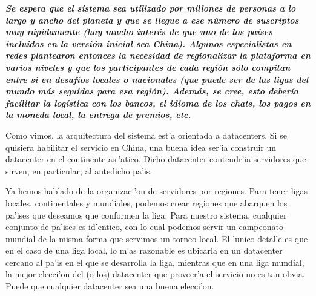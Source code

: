\textbf{\textit{Se espera que el sistema sea utilizado por millones de personas a lo largo y ancho del planeta y que se llegue a ese número de suscriptos muy rápidamente (hay mucho interés de que uno de los países incluidos en la versión inicial sea China). Algunos especialistas en redes plantearon entonces la necesidad de regionalizar la plataforma en varios niveles y que los participantes de cada región sólo compitan entre sí en desafíos locales o nacionales (que puede ser de las ligas del mundo más seguidas para esa región). Además, se cree, esto debería facilitar la logística con los bancos, el idioma de los chats, los pagos en la moneda local, la entrega de premios, etc.
}}

Como vimos, la arquitectura del sistema est'a orientada a datacenters. Si se quisiera habilitar el servicio en China, una buena idea ser'ia construir un datacenter en el continente asi'atico. Dicho datacenter contendr'ia servidores que sirven, en particular, al antedicho pa'is.

Ya hemos hablado de la organizaci'on de servidores por regiones. Para tener ligas locales, continentales y mundiales, podemos crear regiones que abarquen los pa'ises que deseamos que conformen la liga. Para nuestro sistema, cualquier conjunto de pa'ises es id'entico, con lo cual podemos servir un campeonato mundial de la misma forma que servimos un torneo local. El 'unico detalle es que en el caso de una liga local, lo m'as razonable es ubicarla en un datacenter cercano al pa'is en el que se desarrolla la liga, mientras que en una liga mundial, la mejor elecci'on del (o los) datacenter que proveer'a el servicio no es tan obvia. Puede que cualquier datacenter sea una buena elecci'on.

